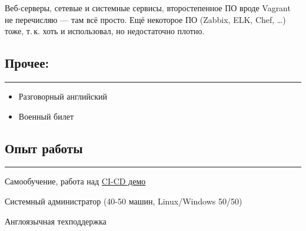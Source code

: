 \documentclass[11pt, a4paper]{article}
\newcommand{\Delimitline}{
  \vspace{-4ex}
  \textcolor[RGB]{120,120,120}{\rule{\linewidth}{1pt}}
  \vspace{-4ex}
}
\begin{document}
Веб-серверы, сетевые и системные сервисы, второстепенное ПО вроде Vagrant не перечисляю — там всё просто. Ещё некоторое ПО (Zabbix, ELK, Chef, \dots) тоже, т.\,к. хоть и использовал, но недостаточно плотно.

\subsection*{Прочее:}
\Delimitline
\begin{itemize}
  \item Разговорный английский
  \item Военный билет
\end{itemize}

\subsection*{Опыт работы}
\Delimitline
\begin{etaremune}
  \item Самообучение, работа над \href{https://github.com/bititanb/CI-CD-pipeline}{CI-CD демо}
  \item Системный администратор (40-50 машин, Linux/Windows 50/50)
  \item Англоязычная техподдержка
\end{etaremune}
\end{document}
